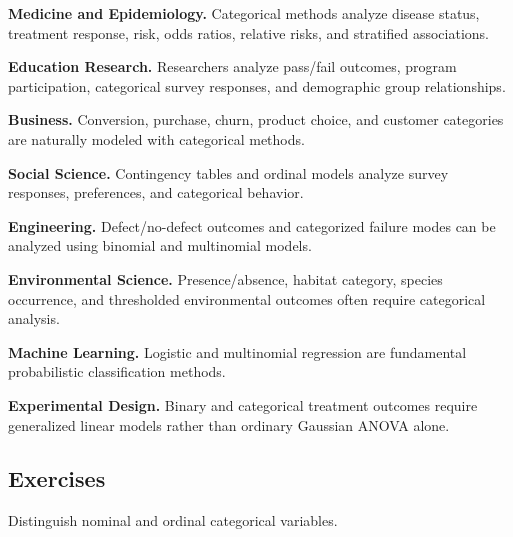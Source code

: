 \begin{applicationbox}

\textbf{Medicine and Epidemiology.}
Categorical methods analyze disease status, treatment response, risk,
odds ratios, relative risks, and stratified associations.

\medskip

\textbf{Education Research.}
Researchers analyze pass/fail outcomes, program participation,
categorical survey responses, and demographic group relationships.

\medskip

\textbf{Business.}
Conversion, purchase, churn, product choice, and customer categories are
naturally modeled with categorical methods.

\medskip

\textbf{Social Science.}
Contingency tables and ordinal models analyze survey responses,
preferences, and categorical behavior.

\medskip

\textbf{Engineering.}
Defect/no-defect outcomes and categorized failure modes can be analyzed
using binomial and multinomial models.

\medskip

\textbf{Environmental Science.}
Presence/absence, habitat category, species occurrence, and thresholded
environmental outcomes often require categorical analysis.

\medskip

\textbf{Machine Learning.}
Logistic and multinomial regression are fundamental probabilistic
classification methods.

\medskip

\textbf{Experimental Design.}
Binary and categorical treatment outcomes require generalized linear
models rather than ordinary Gaussian ANOVA alone.

\end{applicationbox}

\subsection{Exercises}
\label{subsec:categorical-exercises}

\begin{exercise}[1]
Distinguish nominal and ordinal categorical variables.
\end{exercise}


